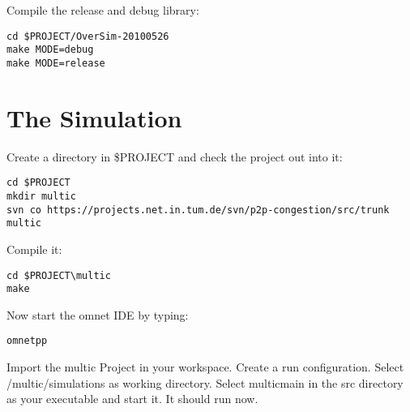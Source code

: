 \documentclass[a4paper,10pt]{article}
\begin{document}
Compile the release and debug library:
\begin{lstlisting}
cd $PROJECT/OverSim-20100526
make MODE=debug
make MODE=release
\end{lstlisting}

\section{The Simulation}

Create a directory in \$PROJECT and check the project out into it:
\begin{lstlisting}
cd $PROJECT
mkdir multic
svn co https://projects.net.in.tum.de/svn/p2p-congestion/src/trunk multic
\end{lstlisting}

Compile it:
\begin{lstlisting}
cd $PROJECT\multic
make
\end{lstlisting}

Now start the omnet IDE by typing:
\begin{lstlisting}
omnetpp
\end{lstlisting}

Import the multic Project in your workspace. Create a run configuration. Select /multic/simulations as working directory. Select multicmain in the src directory as your executable and start it. It should run now.
\end{document}
